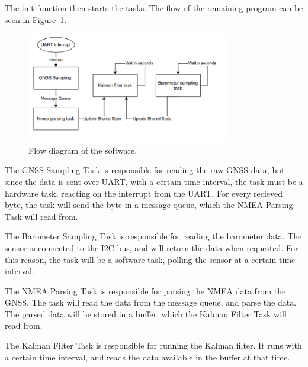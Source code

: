 The init function then starts the tasks.
The flow of the remaining program can be seen in Figure~\ref{fig:flow-diagram}.
\begin{figure}[H]
    \centering
    \includegraphics[width=0.8\textwidth]{chapters/04Software/figures/blockdiagram_loop}
    \caption{Flow diagram of the software.}
    \label{fig:flow-diagram}
\end{figure}

The GNSS Sampling Task is responsible for reading the raw GNSS data, but since the data is sent over UART, with a certain time interval, the task must be a hardware task, reacting on the interrupt from the UART.
For every recieved byte, the task will send the byte in a message queue, which the NMEA Parsing Task will read from.

The Barometer Sampling Task is responsible for reading the barometer data.
The sensor is connected to the I2C bus, and will return the data when requested.
For this reason, the task will be a software task, polling the sensor at a certain time interval.

The NMEA Parsing Task is responsible for parsing the NMEA data from the GNSS.
The task will read the data from the message queue, and parse the data.
The parsed data will be stored in a buffer, which the Kalman Filter Task will read from.

The Kalman Filter Task is responsible for running the Kalman filter.
It runs with a certain time interval, and reads the data available in the buffer at that time.


%
